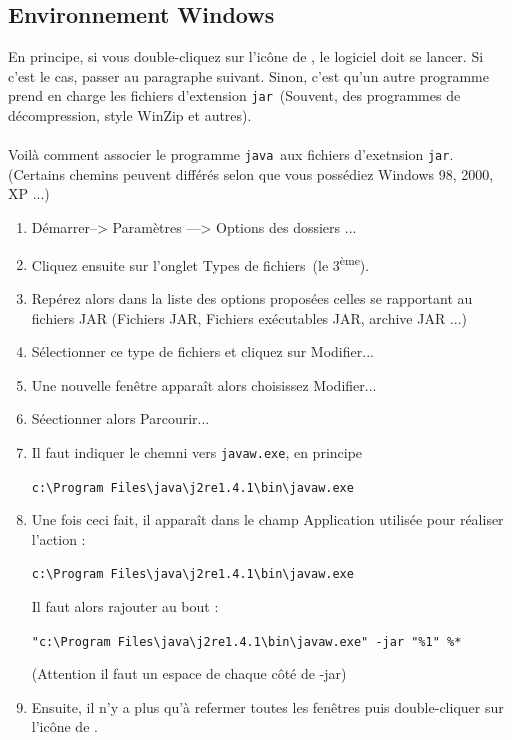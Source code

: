 \subsection{Environnement Windows}
    En principe, si vous double-cliquez sur l’icône de \xlogo, le logiciel doit se lancer. Si c’est le cas,
passer au paragraphe suivant. Sinon, c'est qu'un autre programme prend en charge les fichiers d'extension \og\texttt{jar}\fg\ (Souvent, des programmes de décompression, style WinZip et autres).\\ \\
 Voilà comment associer le programme \og\texttt{java}\fg\ aux fichiers d'exetnsion \og \texttt{jar}\fg. (Certains chemins peuvent différés selon que vous possédiez Windows 98, 2000, XP ...)
\begin{enumerate}
 \item Démarrer–> Paramètres —> Options des dossiers ... 
 \item Cliquez ensuite sur l’onglet \og Types de fichiers\fg\ (le 3\textsuperscript{ème}). 
 \item Repérez alors dans la liste des options proposées celles se rapportant au fichiers JAR (Fichiers JAR, Fichiers exécutables JAR, archive JAR ...) 
 \item Sélectionner ce type de fichiers et cliquez sur \og Modifier...\fg 
 \item Une nouvelle fenêtre apparaît alors choisissez \og Modifier... \fg 
 \item Séectionner alors \og Parcourir...\fg
 \item Il faut indiquer le chemni vers \texttt{javaw.exe}, en principe
\begin{center}
 \texttt{c:\textbackslash Program Files\textbackslash java\textbackslash j2re1.4.1\textbackslash bin\textbackslash javaw.exe}
\end{center}
 \item Une fois ceci fait, il apparaît dans le champ Application utilisée pour réaliser l’action :
\begin{center}
 \texttt{c:\textbackslash Program Files\textbackslash java\textbackslash j2re1.4.1\textbackslash bin\textbackslash javaw.exe}
\end{center}
Il faut alors rajouter au bout :
\begin{center}
\texttt{"c:\textbackslash Program Files\textbackslash java\textbackslash j2re1.4.1\textbackslash bin\textbackslash javaw.exe" -jar "\%1" \%*}
\end{center} 
(Attention il faut un espace de chaque côté de -jar)
\item Ensuite, il n'y a plus qu'à refermer toutes les fenêtres puis double-cliquer sur l'icône de \xlogo. 
\end{enumerate}
